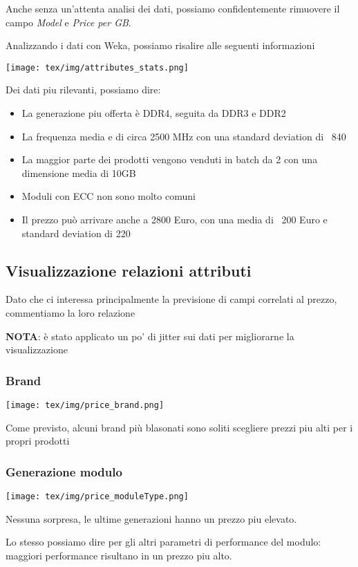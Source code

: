 \documentclass[12pt]{report}
\begin{document}
Anche senza un'attenta analisi dei dati, possiamo confidentemente rimuovere il campo \textit{Model} e \textit{Price per GB}.

Analizzando i dati con Weka, possiamo risalire alle seguenti informazioni

\texttt{[image: tex/img/attributes\_stats.png]}

Dei dati piu rilevanti, possiamo dire:
\begin{itemize}
	\item La generazione piu offerta è DDR4, seguita da DDR3 e DDR2
	\item La frequenza media e di circa 2500 MHz con una standard deviation di ~840
	\item La maggior parte dei prodotti vengono venduti in batch da 2 con una dimensione media di 10GB
	\item Moduli con ECC non sono molto comuni
	\item Il prezzo può arrivare anche a 2800 Euro, con una media di ~200 Euro e standard deviation di 220
\end{itemize}

\newpage
\subsection{Visualizzazione relazioni attributi}
Dato che ci interessa principalmente la previsione di campi correlati al prezzo,
commentiamo la loro relazione

\textbf{NOTA}: è stato applicato un po' di jitter sui dati per migliorarne la visualizzazione

\subsubsection{Brand}
\texttt{[image: tex/img/price\_brand.png]}

Come previsto, alcuni brand più blasonati sono soliti scegliere prezzi piu alti per i propri prodotti

\subsubsection{Generazione modulo}
\texttt{[image: tex/img/price\_moduleType.png]}

Nessuna sorpresa, le ultime generazioni hanno un prezzo piu elevato.

Lo stesso possiamo dire per gli altri parametri di performance del modulo: 
maggiori performance risultano in un prezzo piu alto.
\end{document}
